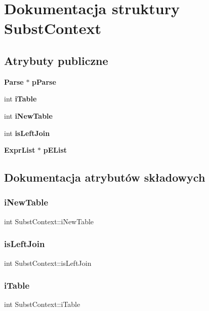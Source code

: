 \section{Dokumentacja struktury Subst\+Context}
\label{struct_subst_context}
\subsection*{Atrybuty publiczne}
\begin{DoxyCompactItemize}
\item 
\textbf{ Parse} $\ast$ \textbf{ p\+Parse}
\item 
int \textbf{ i\+Table}
\item 
int \textbf{ i\+New\+Table}
\item 
int \textbf{ is\+Left\+Join}
\item 
\textbf{ Expr\+List} $\ast$ \textbf{ p\+E\+List}
\end{DoxyCompactItemize}


\subsection{Dokumentacja atrybutów składowych}
\mbox{\label{struct_subst_context_a828f6ffc3b5266cbedc16e149fb0cd19}} 
\subsubsection{iNewTable}
{\footnotesize\ttfamily int Subst\+Context\+::i\+New\+Table}

\mbox{\label{struct_subst_context_a49733a7875355a0a0c84fd182233b1a1}} 
\subsubsection{isLeftJoin}
{\footnotesize\ttfamily int Subst\+Context\+::is\+Left\+Join}

\mbox{\label{struct_subst_context_a453efa99ce17dbce235117d5e46dd6f7}} 
\subsubsection{iTable}
{\footnotesize\ttfamily int Subst\+Context\+::i\+Table}

